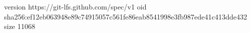 version https://git-lfs.github.com/spec/v1
oid sha256:ef12eb063948e89c74915057c561fe86eab8541998e3fb987ede41c413dde432
size 11068

